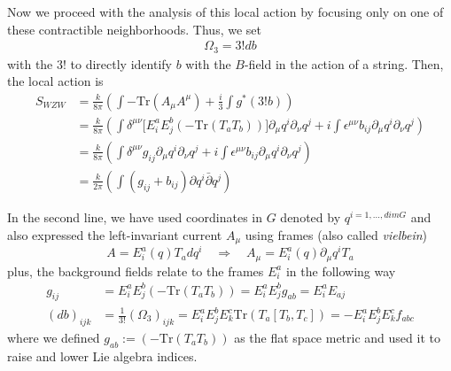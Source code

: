 \documentclass[a4paper,12pt]{article}
\numberwithin{equation}{section}
\numberwithin{thm}{section}
\numberwithin{exm}{section}
\newcommand{\p}{\partial}
\newcommand{\pb}{\bar\partial}
\newcommand{\tr}{\mathrm{Tr}}
\newcommand{\<}{{\langle}}
\renewcommand{\>}{{\rangle}}
\renewcommand{\d}{{\delta}}
\newcommand{\e}{{\epsilon}}
\newcommand{\m}{{\mu}}
\newcommand{\n}{{\nu}}
\newcommand{\Om}{{\Omega}}
\begin{document}
Now we proceed with the analysis of this local action by focusing only on one of these contractible neighborhoods. Thus, we set
	\begin{align}
	\Om_3 = 3! db
	\end{align}
with the $3!$ to directly identify $b$ with the $B$-field in the action of a string. Then, the local action is
	\begin{align}
	S_{WZW} & = \frac{k}{8\pi}\left(\int -\tr (A_\m A^\m) + \frac{i}{3} \int g^*(3!b) \right) \nonumber \\
	& = \frac{k}{8\pi}\left(\int\d^{\m\n}\Big[E_i^a E_j^b (-\tr (T_a T_b))\Big]\p_\m q^i\p_\n q^j + i \int \e^{\m\n}b_{ij}\p_\m q^i\p_\n q^j \right) \nonumber \\
	& = \frac{k}{8\pi} \left(\int\d^{\m\n} g_{ij}\p_\m q^i\p_\n q^j + i \int \e^{\m\n}b_{ij}\p_\m q^i\p_\n q^j \right) \nonumber \\
	& = \frac{k}{2\pi} \left(\int (g_{ij} + b_{ij})\p q^i\pb q^j \right)
	\end{align}

In the second line, we have used coordinates in $G$ denoted by $q^{i=1,\ldots,dim G}$ and also expressed the left-invariant current $A_\m$ using frames (also called {\it vielbein}) 
	\begin{equation}
	A = E_i^a(q) T_a dq^i \quad\Rightarrow\quad A_\m = E_i^a(q) \p_\m q^i T_a
	\end{equation}
plus, the background fields relate to the frames $E^a_i$ in the following way
	\begin{align}
	g_{ij} & = E^a_i E^b_j (-\tr(T_a T_b)) = E^a_i E^b_j g_{ab} = E^a_i E_{aj} \\
	(db)_{ijk} & = \frac{1}{3!}(\Om_3)_{ijk} = E^a_i E^b_j E^c_k \tr(T_a[T_b,T_c]) = - E^a_i E^b_j E^c_k f_{abc}
	\end{align}
where we defined $g_{ab}:=(-\tr(T_a T_b))$ as the flat space metric and used it to raise and lower Lie algebra indices.
\end{document}
